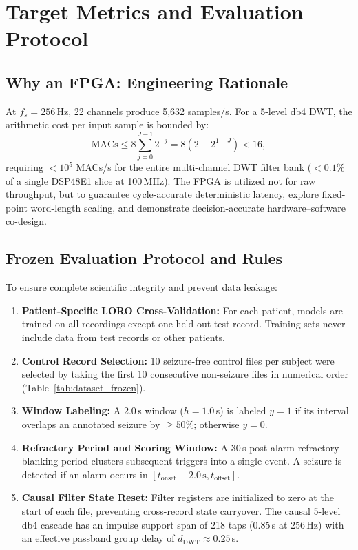 \documentclass[10pt,twocolumn,letterpaper]{article}
\begin{document}
\section{Target Metrics and Evaluation Protocol}
\label{sec:eval}

\subsection{Why an FPGA: Engineering Rationale}
\label{sec:fpga}

At $f_s = 256$\,Hz, 22 channels produce 5,632 samples/s. For a 5-level db4 DWT, the arithmetic cost per input sample is bounded by:
\begin{equation}
  \mathrm{MACs} \le 8\sum_{j=0}^{J-1} 2^{-j} = 8\left(2 - 2^{1-J}\right) < 16,
  \label{eq:macs}
\end{equation}
requiring $<10^5$ MACs/s for the entire multi-channel DWT filter bank ($<0.1\%$ of a single DSP48E1 slice at 100\,MHz). The FPGA is utilized not for raw throughput, but to guarantee cycle-accurate deterministic latency, explore fixed-point word-length scaling, and demonstrate decision-accurate hardware--software co-design.

\subsection{Frozen Evaluation Protocol and Rules}
\label{sec:protocol_rules}

To ensure complete scientific integrity and prevent data leakage:
\begin{enumerate}
  \item \textbf{Patient-Specific LORO Cross-Validation:} For each patient, models are trained on all recordings except one held-out test record. Training sets never include data from test records or other patients.
  \item \textbf{Control Record Selection:} 10 seizure-free control files per subject were selected by taking the first 10 consecutive non-seizure files in numerical order (Table~\ref{tab:dataset_frozen}).
  \item \textbf{Window Labeling:} A 2.0\,s window ($h=1.0$\,s) is labeled $y=1$ if its interval overlaps an annotated seizure by $\ge 50\%$; otherwise $y=0$.
  \item \textbf{Refractory Period and Scoring Window:} A 30\,s post-alarm refractory blanking period clusters subsequent triggers into a single event. A seizure is detected if an alarm occurs in $[t_{\text{onset}} - 2.0\,\text{s}, t_{\text{offset}}]$.
  \item \textbf{Causal Filter State Reset:} Filter registers are initialized to zero at the start of each file, preventing cross-record state carryover. The causal 5-level db4 cascade has an impulse support span of 218 taps (0.85\,s at 256\,Hz) with an effective passband group delay of $d_{\text{DWT}} \approx 0.25$\,s.
\end{enumerate}
\end{document}
